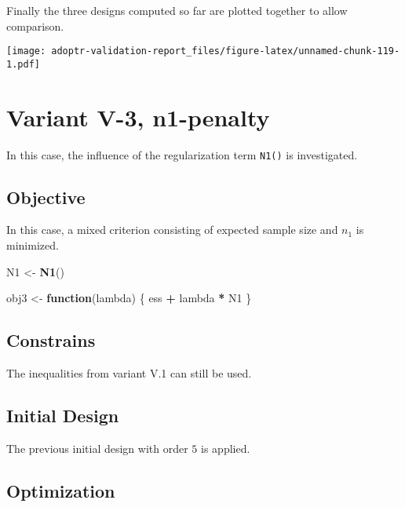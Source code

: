 \documentclass[]{book}
\newenvironment{Shaded}{\begin{snugshade}}{\end{snugshade}}
\newcommand{\ControlFlowTok}[1]{\textcolor[rgb]{0.13,0.29,0.53}{\textbf{#1}}}
\newcommand{\KeywordTok}[1]{\textcolor[rgb]{0.13,0.29,0.53}{\textbf{#1}}}
\newcommand{\NormalTok}[1]{#1}
\newcommand{\OperatorTok}[1]{\textcolor[rgb]{0.81,0.36,0.00}{\textbf{#1}}}
\newcommand{\StringTok}[1]{\textcolor[rgb]{0.31,0.60,0.02}{#1}}
\begin{document}
Finally the three designs computed so far are plotted together to allow
comparison.

\texttt{[image: adoptr-validation-report\_files/figure-latex/unnamed-chunk-119-1.pdf]}

\hypertarget{variantV_3}{%
\section{Variant V-3, n1-penalty}\label{variantV_3}}

In this case, the influence of the regularization term \texttt{N1()} is investigated.

\hypertarget{objective-12}{%
\subsection{Objective}\label{objective-12}}

In this case, a mixed criterion consisting of expected sample size and
\(n_1\) is minimized.

\begin{Shaded}
\begin{Highlighting}[]
\NormalTok{N1 <-}\StringTok{ }\KeywordTok{N1}\NormalTok{()}

\NormalTok{obj3 <-}\StringTok{ }\ControlFlowTok{function}\NormalTok{(lambda) \{}
\NormalTok{    ess }\OperatorTok{+}\StringTok{ }\NormalTok{lambda }\OperatorTok{*}\StringTok{ }\NormalTok{N1}
\NormalTok{\}}
\end{Highlighting}
\end{Shaded}

\hypertarget{constrains-12}{%
\subsection{Constrains}\label{constrains-12}}

The inequalities from variant V.1 can still be used.

\hypertarget{initial-design-11}{%
\subsection{Initial Design}\label{initial-design-11}}

The previous initial design with order \(5\) is applied.

\hypertarget{optimization-11}{%
\subsection{Optimization}\label{optimization-11}}
\end{document}
